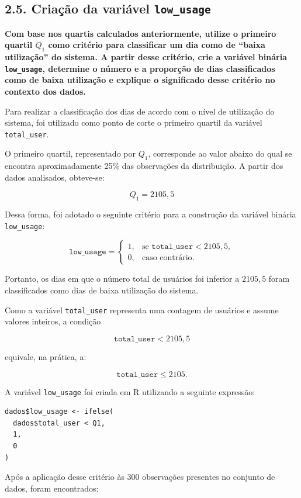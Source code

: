 \documentclass[12pt,a4paper]{article}
\begin{document}
\subsection*{2.5. Criação da variável \texttt{low\_usage}}

\textbf{Com base nos quartis calculados anteriormente, utilize o primeiro quartil $Q_1$ como critério para classificar um dia como de ``baixa utilização'' do sistema. A partir desse critério, crie a variável binária \texttt{low\_usage}, determine o número e a proporção de dias classificados como de baixa utilização e explique o significado desse critério no contexto dos dados.}

Para realizar a classificação dos dias de acordo com o nível de utilização do sistema, foi utilizado como ponto de corte o primeiro quartil da variável \texttt{total\_user}.

O primeiro quartil, representado por $Q_1$, corresponde ao valor abaixo do qual se encontra aproximadamente 25\% das observações da distribuição. A partir dos dados analisados, obteve-se:

\[
Q_1 = 2105{,}5
\]

Dessa forma, foi adotado o seguinte critério para a construção da variável binária \texttt{low\_usage}:

\[
\texttt{low\_usage} =
\begin{cases}
1, & \text{se } \texttt{total\_user} < 2105{,}5,\\
0, & \text{caso contrário}.
\end{cases}
\]

Portanto, os dias em que o número total de usuários foi inferior a $2105{,}5$ foram classificados como dias de baixa utilização do sistema.

Como a variável \texttt{total\_user} representa uma contagem de usuários e assume valores inteiros, a condição

\[
\texttt{total\_user} < 2105{,}5
\]

equivale, na prática, a:

\[
\texttt{total\_user} \leq 2105.
\]

A variável \texttt{low\_usage} foi criada em R utilizando a seguinte expressão:

\begin{verbatim}
dados$low_usage <- ifelse(
  dados$total_user < Q1,
  1,
  0
)
\end{verbatim}

Após a aplicação desse critério às 300 observações presentes no conjunto de dados, foram encontrados:
\end{document}
